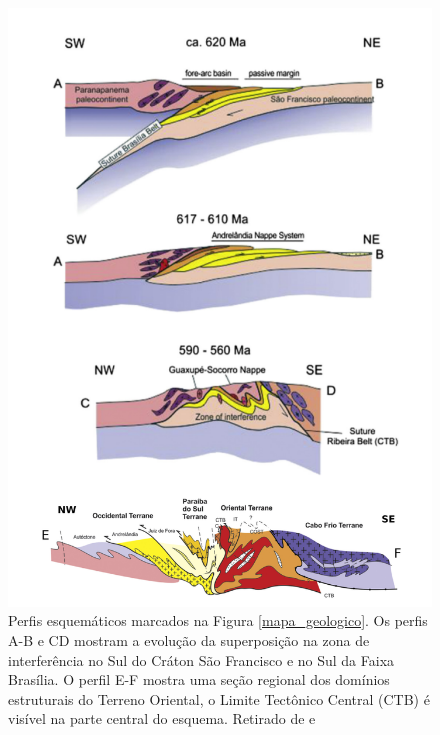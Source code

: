 \begin{figure}[!ht]
\centering
\includegraphics[scale=0.7]{Figs/perfil_esquematico_area.png}
\caption[Perfis esquemáticos da Região do Sudeste do Brasil segundo \cite{trouw_new_2013}.]{Perfis esquemáticos marcados na Figura \ref{mapa_geologico}.  Os perfis A-B e CD mostram a evolução da superposição na zona de interferência no Sul do Cráton São Francisco e no Sul da Faixa Brasília. O perfil E-F mostra uma seção regional dos domínios estruturais do Terreno Oriental, o Limite Tectônico Central (CTB) é visível na parte central do esquema. Retirado de \cite{trouw_new_2013} e \cite{heilbron_serra_2013}}
\label{perfil_esquematico}
\end{figure} 

